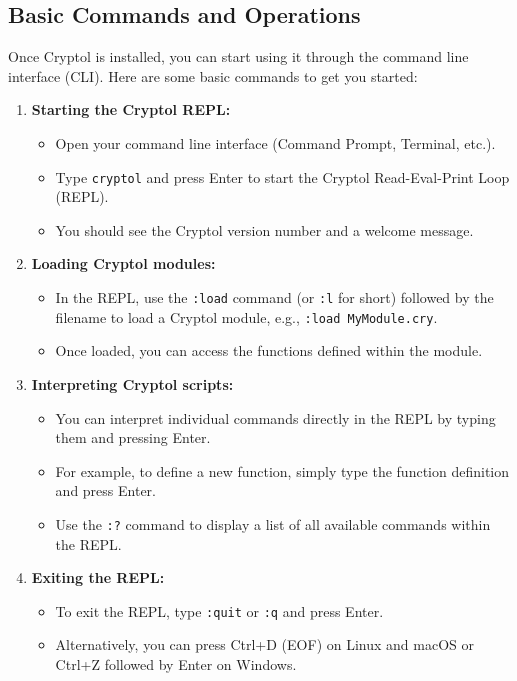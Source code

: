 \subsection{Basic Commands and Operations}
Once Cryptol is installed, you can start using it through the command line interface (CLI). Here are some basic commands to get you started:

\begin{enumerate}
	\item \textbf{Starting the Cryptol REPL:} 
	\begin{itemize}
		\item Open your command line interface (Command Prompt, Terminal, etc.).
		\item Type \texttt{cryptol} and press Enter to start the Cryptol Read-Eval-Print Loop (REPL).
		\item You should see the Cryptol version number and a welcome message.
	\end{itemize}
	
	\item \textbf{Loading Cryptol modules:}
	\begin{itemize}
		\item In the REPL, use the \texttt{:load} command (or \texttt{:l} for short) followed by the filename to load a Cryptol module, e.g., \texttt{:load MyModule.cry}.
		\item Once loaded, you can access the functions defined within the module.
	\end{itemize}
	
	\item \textbf{Interpreting Cryptol scripts:}
	\begin{itemize}
		\item You can interpret individual commands directly in the REPL by typing them and pressing Enter.
		\item For example, to define a new function, simply type the function definition and press Enter.
		\item Use the \texttt{:?} command to display a list of all available commands within the REPL.
	\end{itemize}
	
	\item \textbf{Exiting the REPL:}
	\begin{itemize}
		\item To exit the REPL, type \texttt{:quit} or \texttt{:q} and press Enter.
		\item Alternatively, you can press Ctrl+D (EOF) on Linux and macOS or Ctrl+Z followed by Enter on Windows.
	\end{itemize}
\end{enumerate}

